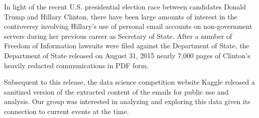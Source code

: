 In light of the recent U.S. presidential election race between candidates Donald Trump and Hillary Clinton, there have been large amounts of interest in the controversy involving Hillary's use of personal email accounts on non-government servers during her previous career as Secretary of State. 
After a number of Freedom of Information lawsuits were filed against the Department of State, the Department of State released on August 31, 2015 nearly 7,000 pages of Clinton's heavily redacted communications in PDF form.

Subsequent to this release, the data science competition website Kaggle released a sanitized version of the extracted content of the emails for public use and analysis. 
Our group was interested in analyzing and exploring this data given its connection to current events at the time.